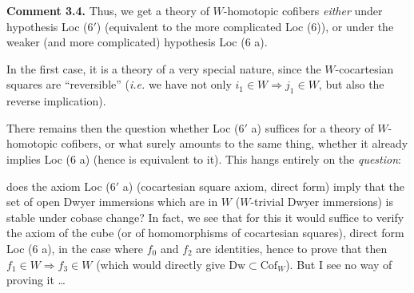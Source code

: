 \documentclass[11pt]{article}
\newcommand{\printedpage}[1]{\marginpar{\footnotesize p.~#1}}
\newcommand{\msp}[1]{\marginpar{\footnotesize [#1]}}
\newcommand{\Cof}{\mathrm{Cof}}
\begin{document}
\textbf{Comment 3.4.} Thus, we get a theory of $W$-homotopic cofibers \textit{either} under hypothesis Loc (6$'$) (equivalent to the more complicated Loc (6)), or under the weaker (and more complicated) hypothesis Loc (6 a).

In the first case, it is a theory of a very special nature, since the $W$-cocartesian squares are ``reversible'' (\textit{i.e.} we have not only $i_1 \in W \Longrightarrow j_1 \in W$, but also the reverse implication).

There remains then the question whether Loc (6$'$ a) suffices for a theory of $W$-homotopic cofibers, or what surely amounts to the same thing, whether it already implies Loc (6 a) (hence is equivalent to it). This hangs entirely on the \textit{question}:

\printedpage{16}
\msp{page 23}%
does the axiom Loc (6$'$ a) (cocartesian square axiom, direct form) imply that the set of open Dwyer immersions which are in $W$ ($W$-trivial Dwyer immersions) is stable under cobase change? In fact, we see that for this it would suffice to verify the axiom of the cube (or of homomorphisms of cocartesian squares), direct form Loc (6 a), in the case where $f_0$ and $f_2$ are identities, hence to prove that then $f_1 \in W \Longrightarrow f_3 \in W$ (which would directly give $\mathrm{Dw} \subset \Cof_W$). But I see no way of proving it \dots
\end{document}
